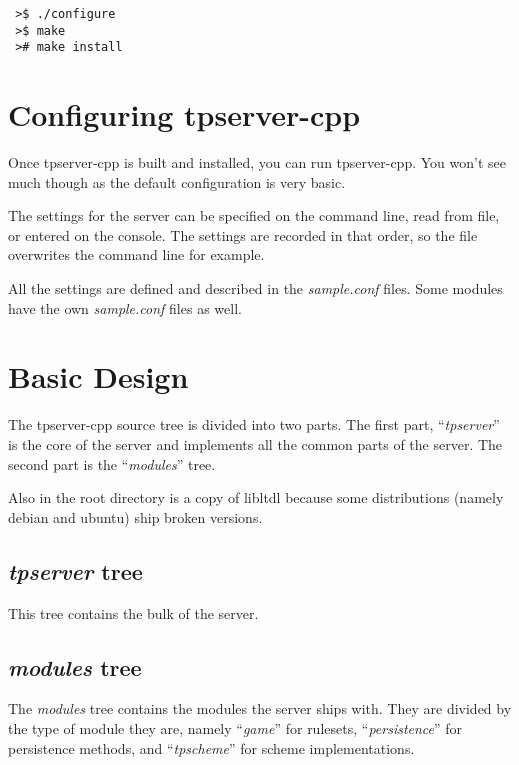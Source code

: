\documentclass[a4paper,11pt]{report}
\newcommand{\filename}[1]{\emph{#1}}
\begin{document}
\begin{verbatim}
 >$ ./configure
 >$ make
 ># make install
\end{verbatim}

\chapter{Configuring tpserver-cpp}
\label{chap:configure}

Once tpserver-cpp is built and installed, you can run tpserver-cpp.  You won't see much though as the default configuration is very basic.

The settings for the server can be specified on the command line, read from file, or entered on the console. The settings are recorded in that order, so the file overwrites the command line for example.

All the settings are defined and described in the \filename{sample.conf} files. Some modules have the own \filename{sample.conf} files as well.

\chapter{Basic Design}
\label{chap:design-basic}

The tpserver-cpp source tree is divided into two parts. The first part, ``\filename{tpserver}'' is the core of the server and implements all the common parts of the server. The second part is the ``\filename{modules}'' tree.

Also in the root directory is a copy of libltdl because some distributions (namely debian and ubuntu) ship broken versions.

\section{\filename{tpserver} tree}
\label{sec:tree-tpserver}

This tree contains the bulk of the server.

\section{\filename{modules} tree}
\label{sec:tree-modules}

The \filename{modules} tree contains the modules the server ships with. They are divided by the type of module they are, namely ``\filename{game}'' for rulesets, ``\filename{persistence}'' for persistence methods, and ``\filename{tpscheme}'' for scheme implementations.
\end{document}
